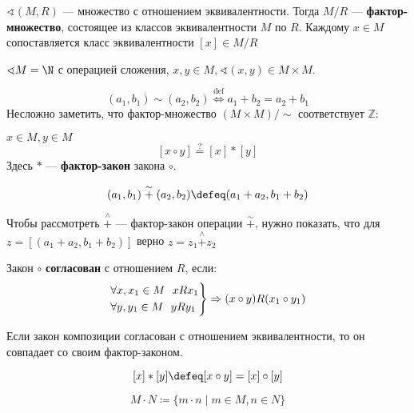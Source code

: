 \begin{definition}
    \(\sphericalangle (M, R)\) --- множество с отношением эквивалентности. Тогда \(M / R\) --- \textbf{фактор-множество}, состоящее из классов эквивалентности \(M\) по \(R\). Каждому \(x \in M\) сопоставляется класс эквивалентности \([x] \in M / R\)
\end{definition}

\begin{example}
    \(\sphericalangle M = \N\) с операцией сложения, \(x, y \in M, \sphericalangle (x, y) \in M \times M\).

    \[(a_1, b_1) \sim (a_2, b_2) \stackrel{\mathrm{def}}{\Leftrightarrow} a_1 + b_2 = a_2 + b_1\]
    Несложно заметить, что фактор-множество \((M \times M) / \sim\) соответствует \(\mathbb{Z}\):
\end{example}

\begin{definition}
    \(x \in M, y \in M\)
    \[[x \circ y] \stackrel{?}{=} [x] * [y]\]
    Здесь \(*\) --- \textbf{фактор-закон} закона \(\circ\).
\end{definition}

\begin{example}
    \[(a_1, b_1) \stackrel{\sim}{+} (a_2, b_2) \defeq (a_1 + a_2, b_1 + b_2)\]

    Чтобы рассмотреть \(\stackrel{\wedge}{+}\) --- фактор-закон операции \(\stackrel{\sim}{+}\), нужно показать, что для \(z = [(a_1 + a_2, b_1 + b_2)]\) верно \(z = z_1 \stackrel{\wedge}{+} z_2\)
\end{example}

\begin{definition}
    Закон \(\circ\) \textbf{согласован} с отношением \(R\), если:
    \[\begin{rcases}
            \forall x, x_1 \in M \ \ xRx_1 \\
            \forall y, y_1 \in M \ \ yRy_1
        \end{rcases} \Rightarrow (x \circ y) R (x_1 \circ y_1)\]
\end{definition}

\begin{theorem}
    Если закон композиции согласован с отношением эквивалентности, то он совпадает со своим фактор-законом.
\end{theorem}

\[[x] * [y] \defeq [x \circ y] = [x] \circ [y]\]

\begin{notation}
    \[M \cdot N \coloneqq \{m \cdot n \mid m \in M, n \in N\}\]
\end{notation}


